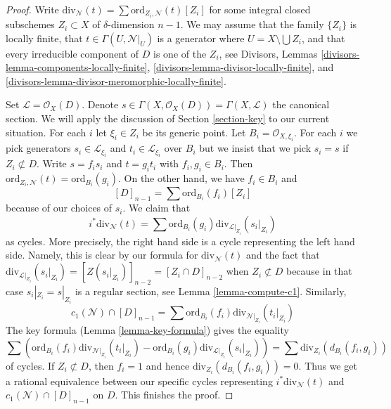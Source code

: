 \begin{proof}
Write $\text{div}_\mathcal{N}(t) = \sum \text{ord}_{Z_i, \mathcal{N}}(t)[Z_i]$
for some integral closed subschemes $Z_i \subset X$ of $\delta$-dimension
$n - 1$. We may assume that the family $\{Z_i\}$ is locally
finite, that $t \in \Gamma(U, \mathcal{N}|_U)$ is a generator
where $U = X \setminus \bigcup Z_i$, and that every irreducible component
of $D$ is one of the $Z_i$, see
Divisors, Lemmas \ref{divisors-lemma-components-locally-finite},
\ref{divisors-lemma-divisor-locally-finite}, and
\ref{divisors-lemma-divisor-meromorphic-locally-finite}.

\medskip\noindent
Set $\mathcal{L} = \mathcal{O}_X(D)$. Denote
$s \in \Gamma(X, \mathcal{O}_X(D)) = \Gamma(X, \mathcal{L})$
the canonical section. We will apply the discussion of
Section \ref{section-key} to our current situation.
For each $i$ let $\xi_i \in Z_i$ be its generic point. Let
$B_i = \mathcal{O}_{X, \xi_i}$. For each $i$ we pick generators
$s_i \in \mathcal{L}_{\xi_i}$ and $t_i \in \mathcal{L}_{\xi_i}$
over $B_i$ but we insist that we pick $s_i = s$ if $Z_i \not \subset D$.
Write $s = f_i s_i$ and $t = g_i t_i$ with $f_i, g_i \in B_i$.
Then $\text{ord}_{Z_i, \mathcal{N}}(t) = \text{ord}_{B_i}(g_i)$.
On the other hand, we have $f_i \in B_i$ and
$$
[D]_{n - 1} = \sum \text{ord}_{B_i}(f_i)[Z_i]
$$
because of our choices of $s_i$. We claim that
$$
i^*\text{div}_\mathcal{N}(t) =
\sum \text{ord}_{B_i}(g_i) \text{div}_{\mathcal{L}|_{Z_i}}(s_i|_{Z_i})
$$
as cycles. More precisely, the right hand side is a cycle
representing the left hand side. Namely, this is clear by our
formula for $\text{div}_\mathcal{N}(t)$ and the fact that
$\text{div}_{\mathcal{L}|_{Z_i}}(s_i|_{Z_i}) = [Z(s_i|_{Z_i})]_{n - 2} =
[Z_i \cap D]_{n - 2}$ when $Z_i \not \subset D$ because in
that case $s_i|_{Z_i} = s|_{Z_i}$ is a regular section, see
Lemma \ref{lemma-compute-c1}. Similarly,
$$
c_1(\mathcal{N}) \cap [D]_{n - 1} =
\sum \text{ord}_{B_i}(f_i) \text{div}_{\mathcal{N}|_{Z_i}}(t_i|_{Z_i})
$$
The key formula (Lemma \ref{lemma-key-formula}) gives the equality
$$
\sum \left(
\text{ord}_{B_i}(f_i) \text{div}_{\mathcal{N}|_{Z_i}}(t_i|_{Z_i}) -
\text{ord}_{B_i}(g_i) \text{div}_{\mathcal{L}|_{Z_i}}(s_i|_{Z_i}) \right) =
\sum \text{div}_{Z_i}(d_{B_i}(f_i, g_i))
$$
of cycles. If $Z_i \not \subset D$, then $f_i = 1$ and hence
$\text{div}_{Z_i}(d_{B_i}(f_i, g_i)) = 0$. Thus we get a rational
equivalence between our specific cycles representing
$i^*\text{div}_\mathcal{N}(t)$ and $c_1(\mathcal{N}) \cap [D]_{n - 1}$
on $D$. This finishes the proof.
\end{proof}

